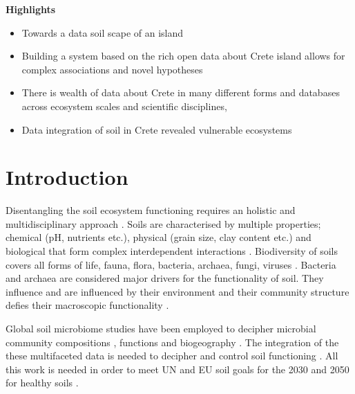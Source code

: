 \documentclass[a4paper,12pt]{article}
\begin{document}
\noindent\textbf{Highlights}

\begin{itemize}
    \item Towards a data soil scape of an island
    \item Building a system based on the rich open data about Crete island allows for complex associations and novel hypotheses
    \item There is wealth of data about Crete in many different forms and databases across ecosystem scales and scientific disciplines,
    \item Data integration of soil in Crete revealed vulnerable ecosystems
\end{itemize}


\section{Introduction}\label{intro_idea}

Disentangling the soil ecosystem functioning requires an holistic and 
multidisciplinary approach \parencite{vogel2022}. 
Soils are characterised by multiple properties; chemical (pH, nutrients etc.),
physical (grain size, clay content etc.) and biological that 
form complex interdependent interactions \parencite{philippot2024the-interplay}.
Biodiversity of soils covers
all forms of life, fauna, flora, bacteria, archaea, fungi, viruses \parencite{Orgiazzi2018,Anthony2023}. 
Bacteria and archaea are considered major drivers for the functionality of soil.
They influence and are influenced by their environment and their community structure 
defies their macroscopic functionality \parencite{Bahram2018}.

Global soil microbiome studies have been employed to decipher microbial community
compositions \parencite{fierer2012cross-biome,thompson2017a-communal, Delgado-Baquerizo2018, Labouyrie2023},
functions \parencite{Bahram2018} and biogeography \parencite{Martiny2006, Guerra2020}.
The integration of the these multifaceted 
data is needed to decipher and control soil functioning \parencite{ramirez2015toward}.
All this work is needed in order to meet
UN and EU soil goals for the 2030 and 2050 for healthy soils \parencite{LAL2021e00398}.
\end{document}
